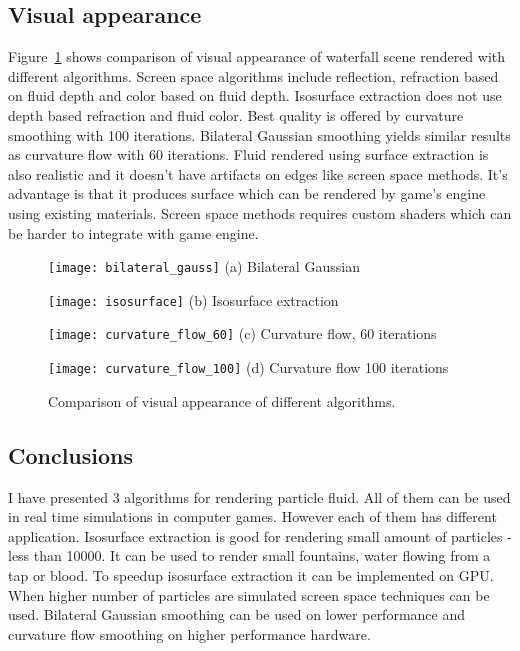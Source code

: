 \subsection{Visual appearance}

Figure~\ref{fig:visual_appearance} shows comparison of visual appearance of waterfall scene rendered with different algorithms. Screen space algorithms include reflection, refraction based on fluid depth and color based on fluid depth. Isosurface extraction does not use depth based refraction and fluid color. Best quality is offered by curvature smoothing with 100 iterations. Bilateral Gaussian smoothing yields similar results as curvature flow with 60 iterations. Fluid rendered using surface extraction is also realistic and it doesn't have artifacts on edges like screen space methods. It's advantage is that it produces surface which can be rendered by game's engine using existing materials. Screen space methods requires custom shaders which can be harder to integrate with game engine. 

\begin{figure}[ht]
\begin{minipage}[b]{0.5\linewidth}
\centering
\texttt{[image: bilateral\_gauss]}
(a) Bilateral Gaussian
\end{minipage}
\hspace{0.5cm}
\vspace{0.5cm}
\begin{minipage}[b]{0.5\linewidth}
\centering
\texttt{[image: isosurface]}
(b) Isosurface extraction
\end{minipage}
\vspace{0.5cm}
\begin{minipage}[b]{0.5\linewidth}
\centering
\texttt{[image: curvature\_flow\_60]}
(c) Curvature flow, 60 iterations
\end{minipage}
\hspace{0.5cm}
\begin{minipage}[b]{0.5\linewidth}
\centering
\texttt{[image: curvature\_flow\_100]}
(d) Curvature flow 100 iterations
\end{minipage}
\caption{Comparison of visual appearance of different algorithms.}
\label{fig:visual_appearance}
\end{figure}

\subsection{Conclusions}
I have presented 3 algorithms for rendering particle fluid. All of them can be used in real time simulations in computer games. However each of them has different application. Isosurface extraction is good for rendering small amount of particles - less than 10000. It can be used to render small fountains, water flowing from a tap or blood. To speedup isosurface extraction it can be implemented on GPU. 
When higher number of particles are simulated screen space techniques can be used. Bilateral Gaussian smoothing can be used on lower performance and curvature flow smoothing on higher performance hardware. 





